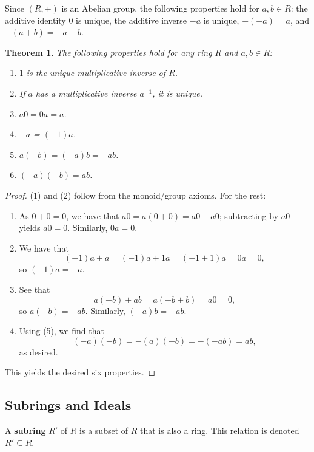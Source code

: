 \documentclass[11pt]{article}
\newtheorem{theorem}{Theorem}
\begin{document}
Since $(R, +)$ is an Abelian group, the following properties hold for $a, b \in R$: the additive identity $0$ is unique, the additive inverse $-a$ is unique, $-(-a) = a$, and $-(a + b) = -a - b$.

\begin{adjustwidth}{0.5cm}{}
	\begin{theorem}
		The following properties hold for any ring $R$ and $a, b \in R$:
		\begin{enumerate}
			\item $1$ is the unique multiplicative inverse of $R$.
			\item If $a$ has a multiplicative inverse $a^{-1}$, it is unique.
			\item $a0 = 0a = a$.
			\item $-a$ = $(-1)a$.
			\item $a(-b) = (-a)b = -ab$.
			\item $(-a)(-b) = ab$.
		\end{enumerate}
	\end{theorem}
	\newpage
	\begin{proof}
		(1) and (2) follow from the monoid/group axioms. For the rest:
		\begin{enumerate}\addtocounter{enumi}{2}
			\item As $0 + 0 = 0$, we have that $a0 = a(0 + 0) = a0 + a0$; subtracting by $a0$ yields $a0 = 0$. Similarly, $0a = 0$.
			\item We have that 
			\[
				(-1)a + a = (-1)a + 1a = (-1 + 1)a = 0a = 0,
			\]
			so $(-1)a = -a$.
			\item See that
			\[
				a(-b) + ab = a(-b + b) = a0 = 0,
			\]
			so $a(-b) = -ab$. Similarly, $(-a)b = -ab$.
			\item Using (5), we find that
			\[
				(-a)(-b) = -(a)(-b) = -(-ab) = ab,
			\]
			as desired.
		\end{enumerate}
		This yields the desired six properties.
	\end{proof}
\end{adjustwidth}


\subsection{Subrings and Ideals}

A \textbf{subring} $R'$ of $R$ is a subset of $R$ that is also a ring. This relation is denoted $R' \subseteq R$.
\end{document}

